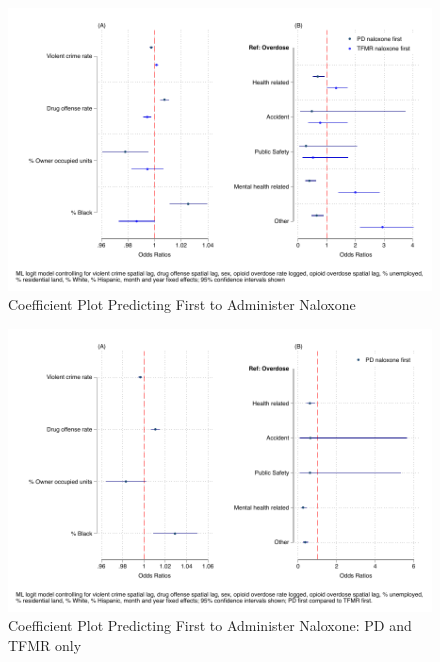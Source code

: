 \newpage



\newpage

\begin{figure}
    \caption{Coefficient Plot Predicting First to Administer Naloxone}
    \centering
    \includegraphics{figures/me-logit-coef-comb.pdf}
\end{figure}

\newpage 



\newpage
\begin{figure}
    \caption{Coefficient Plot Predicting First to Administer Naloxone: PD and TFMR only}
    \centering
    \includegraphics{figures/me-logit-coef-comb-sens.pdf}
\end{figure}
